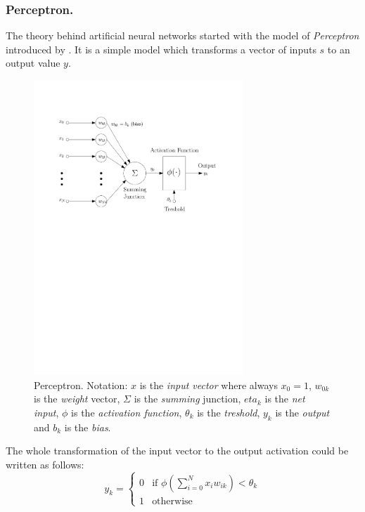 \subsubsection{Perceptron.}

The theory behind artificial neural networks started with the model of \emph{Perceptron} introduced by \citet{mcculloch1943logical}. It is a simple model which transforms a vector of inputs $s$ to an output value $y$. 

\begin{figure}[h]
  \centering
  \includegraphics[width=0.7\textwidth]{img/perceptron.pdf}    
  \caption{Perceptron. Notation: $x$ is the \emph{input vector} where always $x_0=1$, $w_{0k}$ is the \emph{weight} vector, $\Sigma$ is the \emph{summing} junction, $eta_k$ is the \emph{net input}, $\phi$ is the \emph{activation function}, $\theta_k$ is the \emph{treshold}, $y_k$ is the \emph{output} and $b_k$ is the \emph{bias}.} 
  \label{fig:perceptron}
\end{figure}

The whole transformation of the input vector to the output activation could be written as follows: 
\begin{equation}
\label{eq:perceptron} 
y_k =
\left\{
	\begin{array}{ll}
		0 & \mbox{if } \phi(\sum_{i=0}^N x_iw_{ik}) < \theta_k \\
		1 & \mbox{otherwise}
	\end{array}
\right.
\end{equation} 


